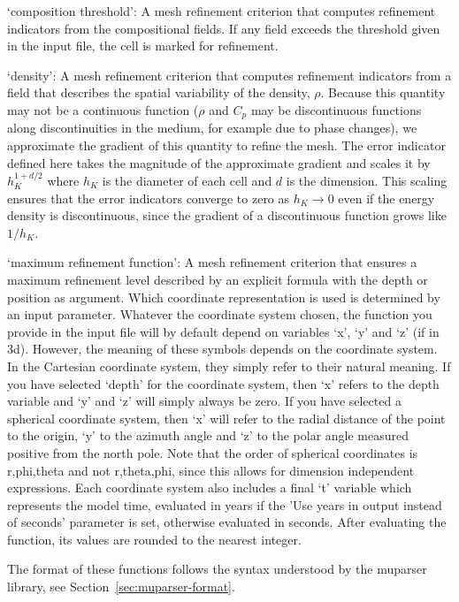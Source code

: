 \begin{itemize}
`composition threshold': A mesh refinement criterion that computes refinement indicators from the compositional fields. If any field exceeds the threshold given in the input file, the cell is marked for refinement.

`density': A mesh refinement criterion that computes refinement indicators from a field that describes the spatial variability of the density, $\rho$. Because this quantity may not be a continuous function ($\rho$ and $C_p$ may be discontinuous functions along discontinuities in the medium, for example due to phase changes), we approximate the gradient of this quantity to refine the mesh. The error indicator defined here takes the magnitude of the approximate gradient and scales it by $h_K^{1+d/2}$ where $h_K$ is the diameter of each cell and $d$ is the dimension. This scaling ensures that the error indicators converge to zero as $h_K\rightarrow 0$ even if the energy density is discontinuous, since the gradient of a discontinuous function grows like $1/h_K$.

`maximum refinement function': A mesh refinement criterion that ensures a maximum refinement level described by an explicit formula with the depth or position as argument. Which coordinate representation is used is determined by an input parameter. Whatever the coordinate system chosen, the function you provide in the input file will by default depend on variables `x', `y' and `z' (if in 3d). However, the meaning of these symbols depends on the coordinate system. In the Cartesian coordinate system, they simply refer to their natural meaning. If you have selected `depth' for the coordinate system, then `x' refers to the depth variable and `y' and `z' will simply always be zero. If you have selected a spherical coordinate system, then `x' will refer to the radial distance of the point to the origin, `y' to the azimuth angle and `z' to the polar angle measured positive from the north pole. Note that the order of spherical coordinates is r,phi,theta and not r,theta,phi, since this allows for dimension independent expressions. Each coordinate system also includes a final `t' variable which represents the model time, evaluated in years if the 'Use years in output instead of seconds' parameter is set, otherwise evaluated in seconds. After evaluating the function, its values are rounded to the nearest integer.

The format of these functions follows the syntax understood by the muparser library, see Section~\ref{sec:muparser-format}.


\end{itemize}
